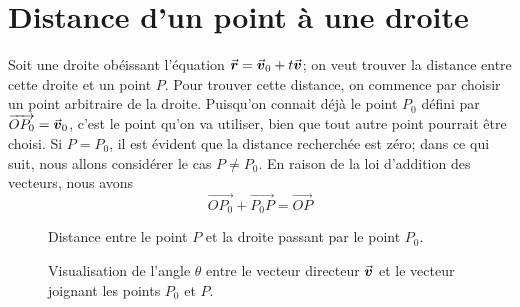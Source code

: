 \section{Distance d'un point à une droite}

Soit une droite obéissant l'équation $\vec{\boldsymbol{r}} = \vec{\boldsymbol{v}}_0 + t \vec{\boldsymbol{v}}$; on veut
trouver la distance entre cette droite et un point $P$.  Pour trouver cette distance,
on commence par choisir un point arbitraire de la droite.  Puisqu'on connait déjà
le point $P_0$ défini par $\overrightarrow{OP_0} = \vec{\boldsymbol{v}}_0$, c'est le point qu'on
va utiliser, bien que tout autre point pourrait être choisi. Si $P=P_0$, il est évident
que la distance recherchée est zéro; dans ce qui suit, nous allons considérer le cas
$P\neq P_0$.
 En raison de la loi d'addition des vecteurs, nous avons
\[
\overrightarrow{OP_0} + \overrightarrow{P_0 P} = \overrightarrow{OP}
\]

\begin{figure}[h]
\begin{minipage}{0.45\textwidth}
\caption{\label{fig:DistDroitePoint1} Distance entre le point $P$ et la
droite passant par le point $P_0$.}
\end{minipage}\hfill
\begin{minipage}{0.45\textwidth}

\caption{\label{fig:DistDroitePoint2} Visualisation de l'angle $\theta$ entre
le vecteur directeur $\vec{\boldsymbol{v}}$ et le vecteur joignant les points $P_0$ et $P$.}

\end{minipage}
\end{figure}




